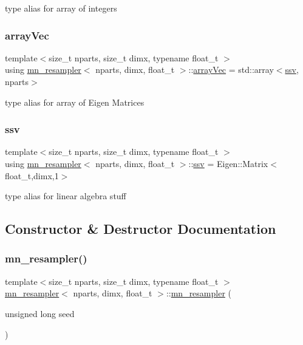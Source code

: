 type alias for array of integers \mbox{\label{classmn__resampler_aa8ff37576399807b14a7a12615032bb1}} 
\subsubsection{\texorpdfstring{array\+Vec}{arrayVec}}
{\footnotesize\ttfamily template$<$size\+\_\+t nparts, size\+\_\+t dimx, typename float\+\_\+t $>$ \\
using \hyperlink{classmn__resampler}{mn\+\_\+resampler}$<$ nparts, dimx, float\+\_\+t $>$\+::\hyperlink{classrbase_aa12fc826befa6ba0647b5f59ebc396ee}{array\+Vec} =  std\+::array$<$\hyperlink{classrbase_ae20e0b8df15aa109252f57ecbf1f20f8}{ssv}, nparts$>$}

type alias for array of Eigen Matrices \mbox{\label{classmn__resampler_a1cb075b42f73e01de7fc1b27f51bfc4c}} 
\subsubsection{\texorpdfstring{ssv}{ssv}}
{\footnotesize\ttfamily template$<$size\+\_\+t nparts, size\+\_\+t dimx, typename float\+\_\+t $>$ \\
using \hyperlink{classmn__resampler}{mn\+\_\+resampler}$<$ nparts, dimx, float\+\_\+t $>$\+::\hyperlink{classrbase_ae20e0b8df15aa109252f57ecbf1f20f8}{ssv} =  Eigen\+::\+Matrix$<$float\+\_\+t,dimx,1$>$}

type alias for linear algebra stuff 

\subsection{Constructor \& Destructor Documentation}
\mbox{\label{classmn__resampler_a179cbea35530cf7e171b1d214e1d9776}} 
\subsubsection{\texorpdfstring{mn\+\_\+resampler()}{mn\_resampler()}}
{\footnotesize\ttfamily template$<$size\+\_\+t nparts, size\+\_\+t dimx, typename float\+\_\+t $>$ \\
\hyperlink{classmn__resampler}{mn\+\_\+resampler}$<$ nparts, dimx, float\+\_\+t $>$\+::\hyperlink{classmn__resampler}{mn\+\_\+resampler} (\begin{DoxyParamCaption}\item[{unsigned long}]{seed }\end{DoxyParamCaption})}



